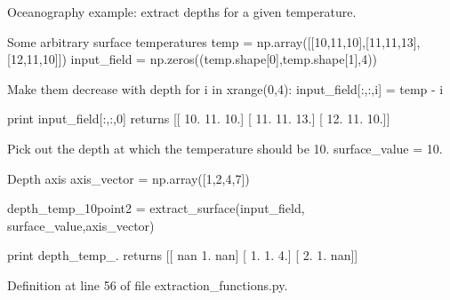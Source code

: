 Oceanography example\+: extract depths for a given temperature.

Some arbitrary surface temperatures temp = np.\+array(\mbox{[}\mbox{[}10,11,10\mbox{]},\mbox{[}11,11,13\mbox{]},\mbox{[}12,11,10\mbox{]}\mbox{]}) input\+\_\+field = np.\+zeros((temp.\+shape\mbox{[}0\mbox{]},temp.\+shape\mbox{[}1\mbox{]},4))

Make them decrease with depth for i in xrange(0,4)\+: input\+\_\+field\mbox{[}\+:,\+:,i\mbox{]} = temp -\/ i

print input\+\_\+field\mbox{[}\+:,\+:,0\mbox{]} returns \mbox{[}\mbox{[} 10. 11. 10.\mbox{]} \mbox{[} 11. 11. 13.\mbox{]} \mbox{[} 12. 11. 10.\mbox{]}\mbox{]}

Pick out the depth at which the temperature should be 10. surface\+\_\+value = 10.

Depth axis axis\+\_\+vector = np.\+array(\mbox{[}1,2,4,7\mbox{]})

depth\+\_\+temp\+\_\+10point2 = extract\+\_\+surface(input\+\_\+field, surface\+\_\+value,axis\+\_\+vector)

print depth\+\_\+temp\+\_. returns \mbox{[}\mbox{[} nan 1. nan\mbox{]} \mbox{[} 1. 1. 4.\mbox{]} \mbox{[} 2. 1. nan\mbox{]}\mbox{]} 

Definition at line 56 of file extraction\+\_\+functions.\+py.

